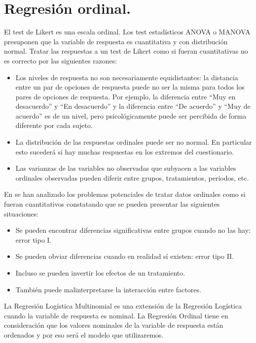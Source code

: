 \documentclass[
  12pt,
  a4paper,
  extrafontsizes,
  onecolumn,
  openright]{memoir}
\providecommand{\tightlist}{%
  \setlength{\itemsep}{0pt}\setlength{\parskip}{0pt}}\usepackage{longtable,booktabs,array}
\begin{document}
\hypertarget{regresiuxf3n-ordinal.}{%
\section{Regresión ordinal.}\label{regresiuxf3n-ordinal.}}

El test de Likert es una escala ordinal. Los test estadísticos ANOVA o
MANOVA presuponen que la variable de respuesta es cuantitativa y con
distribución normal. Tratar las respuestas a un test de Likert como si
fueran cuantitativas no es correcto por las siguientes razones:

\begin{itemize}
\item
  Los niveles de respuesta no son necesariamente equidistantes: la
  distancia entre un par de opciones de respuesta puede no ser la misma
  para todos los pares de opciones de respuesta. Por ejemplo, la
  diferencia entre \enquote{Muy en desacuerdo} y \enquote{En desacuerdo}
  y la diferencia entre \enquote{De acuerdo} y \enquote{Muy de acuerdo}
  es de un nivel, pero psicológicamente puede ser percibida de forma
  diferente por cada sujeto.
\item
  La distribución de las respuestas ordinales puede ser no normal. En
  particular esto sucederá si hay muchas respuestas en los extremos del
  cuestionario.
\item
  Las varianzas de las variables no observadas que subyacen a las
  variables ordinales observadas pueden diferir entre grupos,
  tratamientos, periodos, etc.
\end{itemize}

En \textcite{kruschke2018} se han analizado los problemas potenciales de
tratar datos ordinales como si fueran cuantitativos constatando que se
pueden presentar las siguientes situaciones:

\begin{itemize}
\tightlist
\item
  Se pueden encontrar diferencias significativas entre grupos cuando no
  las hay: error tipo I.
\item
  Se pueden obviar diferencias cuando en realidad sí existen: error tipo
  II.
\item
  Incluso se pueden invertir los efectos de un tratamiento.
\item
  También puede malinterpretarse la interacción entre factores.
\end{itemize}

La Regresión Logística Multinomial es una extensión de la Regresión
Logística cuando la variable de respuesta es nominal. La Regresión
Ordinal tiene en consideración que los valores nominales de la variable
de respuesta están ordenados y por eso será el modelo que utilizaremos.
\end{document}

